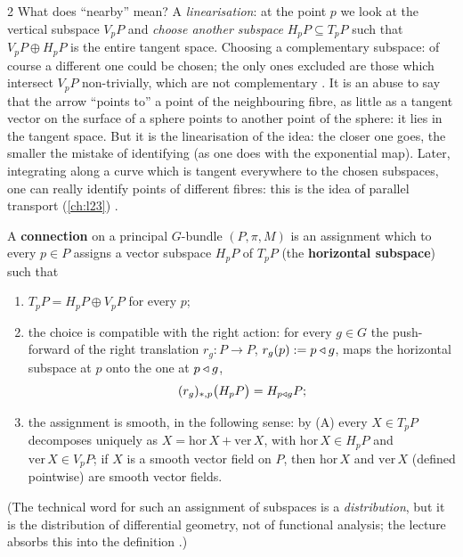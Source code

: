 \begin{paracol}{2}
What does ``nearby'' mean? A \emph{linearisation}: at the point $p$ we look at the vertical subspace $V_pP$ and \emph{choose another subspace} $H_pP\subseteq T_pP$ such that $V_pP\oplus H_pP$ is the entire tangent space. Choosing a complementary subspace: of course a different one could be chosen; the only ones excluded are those which intersect $V_pP$ non-trivially, which are not complementary   . It is an abuse to say that the arrow ``points to'' a point of the neighbouring fibre, as little as a tangent vector on the surface of a sphere points to another point of the sphere: it lies in the tangent space. But it is the linearisation of the idea: the closer one goes, the smaller the mistake of identifying (as one does with the exponential map). Later, integrating along a curve which is tangent everywhere to the chosen subspaces, one can really identify points of different fibres: this is the idea of parallel transport (\cref{ch:l23})    .

\begin{definition}\label{def:cn-connection}
A \textbf{connection} on a principal $G$-bundle $(P,\pi,M)$ is an assignment which to every $p\in P$ assigns a vector subspace $H_pP$ of $T_pP$ (the \textbf{horizontal subspace}) such that
\begin{enumerate}
  \item[(A)] $T_pP=H_pP\oplus V_pP$ for every $p$;
  \item[(B)] the choice is compatible with the right action: for every $g\in G$ the push-forward of the right translation $r_g\colon P\to P$, $r_g(p):=p\mathbin{\triangleleft} g$, maps the horizontal subspace at $p$ onto the one at $p\mathbin{\triangleleft} g$,
  \[
    (r_g)_{*,p}\bigl(H_pP\bigr)=H_{p\mathbin{\triangleleft} g}P ;
  \]
  \item[(C)] the assignment is smooth, in the following sense: by (A) every $X\in T_pP$ decomposes uniquely as $X=\mathrm{hor}\,X+\mathrm{ver}\,X$, with $\mathrm{hor}\,X\in H_pP$ and $\mathrm{ver}\,X\in V_pP$; if $X$ is a smooth vector field on $P$, then $\mathrm{hor}\,X$ and $\mathrm{ver}\,X$ (defined pointwise) are smooth vector fields.
\end{enumerate}
     
\end{definition}
\noindent(The technical word for such an assignment of subspaces is a \emph{distribution}, but it is the distribution of differential geometry, not of functional analysis; the lecture absorbs this into the definition .)


\end{paracol}
